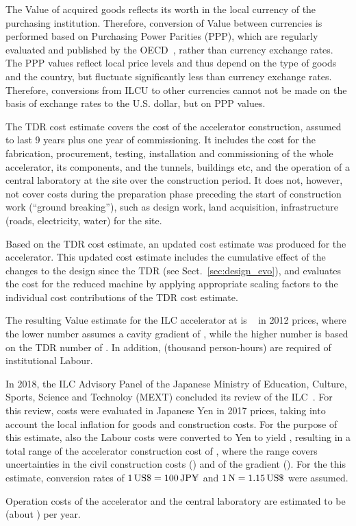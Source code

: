 The Value of acquired goods reflects its worth in the local currency of the purchasing institution. 
Therefore, conversion of Value between currencies is performed based on Purchasing Power Parities (PPP), which are regularly evaluated and published by the OECD~\cite{OECD:2018,Eurostat:2012}, rather than currency exchange rates. 
The PPP values reflect local price levels and thus depend on the type of goods and the country, but fluctuate significantly less than currency exchange rates.
Therefore, conversions from ILCU to other currencies cannot not be made on the basis of exchange rates to the U.S. dollar, but on PPP values.

The TDR cost estimate covers the cost of the accelerator construction, assumed to last 9 years plus one year of commissioning. 
It includes the cost for the fabrication, procurement, testing, installation and commissioning of the whole accelerator, its components, and the tunnels, buildings etc, and the operation of a central laboratory at the site over the construction period. 
It does not, however, not cover costs during the preparation phase preceding the start of construction work (``ground breaking''), such as design work, land acquisition, infrastructure (roads, electricity, water) for the site.

Based on the TDR cost estimate, an updated cost estimate was produced for the  accelerator. 
This updated cost estimate includes the cumulative effect of the changes to the design since the TDR (see Sect.~\ref{sec:design_evo}), and evaluates the cost for the reduced machine by applying appropriate scaling factors to the individual cost contributions of the TDR cost estimate.

The resulting Value estimate for the ILC accelerator at  is 
~\cite{Evans:2017rvt} in 2012 prices, where the lower number assumes a cavity gradient of , while the higher number is based on the TDR number of . 
In addition,  (thousand person-hours) are required of institutional Labour.

In 2018, the ILC Advisory Panel of the Japanese Ministry of Education, Culture, Sports, Science and Technoloy (MEXT) concluded its review of the ILC~\cite{ILCAP:2018}. 
For this review, costs were evaluated in Japanese Yen in 2017 prices, taking into account the local inflation for goods and construction costs.
For the purpose of this estimate, also the Labour costs were converted to Yen to yield , resulting in a total range of the accelerator construction cost of , where the range covers uncertainties in the civil construction costs () and of the gradient ().
For the this estimate, conversion rates of $\siunit{1}{US\$} = \siunit{100}{JP\yen}$ and $\siunit{1}{\euro} = \siunit{1.15}{US\$}$ were assumed.

Operation costs of the accelerator and the central laboratory are estimated to be  (about ) per year.















